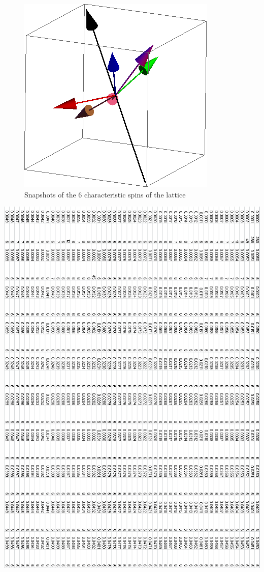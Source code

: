 \documentclass{article}
\begin{document}
\begin{figure}[ht]
\includegraphics[scale=0.27]{111_2000/4S000to005R.png}
\caption{Snapshots of the 6 characteristic spins of the lattice}
\end{figure}

\begin{center}
 \includegraphics[keepaspectratio,scale=0.58]{111_2000/000to005RSpinChart.png}
\end{center}
\end{document}
